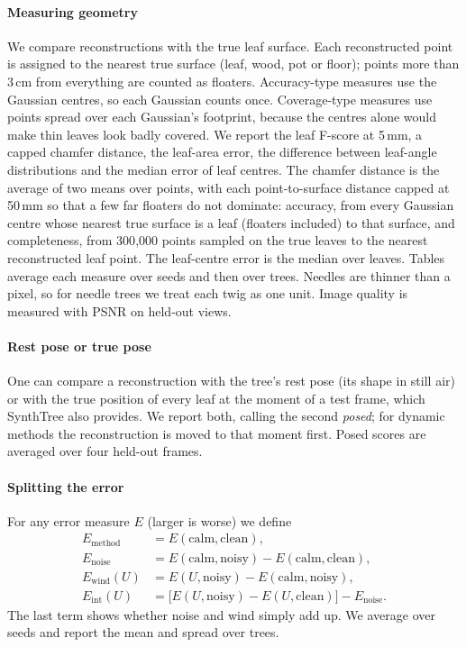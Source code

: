 \documentclass[preprint,11pt,authoryear]{elsarticle}
\begin{document}
\paragraph{Measuring geometry} We compare reconstructions with the true leaf surface. Each reconstructed point is assigned to the nearest true surface (leaf, wood, pot or floor); points more than 3\,cm from everything are counted as floaters. Accuracy-type measures use the Gaussian centres, so each Gaussian counts once. Coverage-type measures use points spread over each Gaussian's footprint, because the centres alone would make thin leaves look badly covered. We report the leaf F-score at 5\,mm, a capped chamfer distance, the leaf-area error, the difference between leaf-angle distributions \citep{ross1981radiation} and the median error of leaf centres. The chamfer distance is the average of two means over points, with each point-to-surface distance capped at 50\,mm so that a few far floaters do not dominate: accuracy, from every Gaussian centre whose nearest true surface is a leaf (floaters included) to that surface, and completeness, from 300{,}000 points sampled on the true leaves to the nearest reconstructed leaf point. The leaf-centre error is the median over leaves. Tables average each measure over seeds and then over trees. Needles are thinner than a pixel, so for needle trees we treat each twig as one unit. Image quality is measured with PSNR on held-out views.

\paragraph{Rest pose or true pose} One can compare a reconstruction with the tree's rest pose (its shape in still air) or with the true position of every leaf at the moment of a test frame, which SynthTree also provides. We report both, calling the second \emph{posed}; for dynamic methods the reconstruction is moved to that moment first. Posed scores are averaged over four held-out frames.

\paragraph{Splitting the error} For any error measure $E$ (larger is worse) we define
\begin{align}
E_{\text{method}} &= E(\text{calm}, \text{clean}), \\
E_{\text{noise}} &= E(\text{calm}, \text{noisy}) - E(\text{calm}, \text{clean}), \\
E_{\text{wind}}(U) &= E(U, \text{noisy}) - E(\text{calm}, \text{noisy}), \\
E_{\text{int}}(U) &= \big[E(U,\text{noisy}) - E(U,\text{clean})\big] - E_{\text{noise}}.
\end{align}
The last term shows whether noise and wind simply add up. We average over seeds and report the mean and spread over trees.
\end{document}
